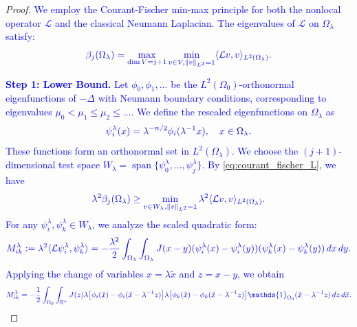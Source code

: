 \documentclass[12pt, a4paper]{article}
\newcommand{\revision}[1]{\textcolor{blue}{#1}}
\theoremstyle{break}
\theoremstyle{break}
\theoremstyle{break}
\theoremstyle{break}
\theoremstyle{break}
\theoremstyle{break}
\theoremstyle{break}
\theoremstyle{break}
\theoremstyle{break}
\begin{document}
\begin{proof}
    \revision{We employ the Courant-Fischer min-max principle for both the nonlocal operator $\mathcal{L}$ and the classical Neumann Laplacian. The eigenvalues of $\mathcal{L}$ on $\Omega_\lambda$ satisfy:}
    \begin{equation}
        \label{eq:courant_fischer_L}
        \revision{\beta_j(\Omega_\lambda) = \max_{\dim V = j+1} \min_{v \in V, \|v\|_{L^2} = 1} \langle \mathcal{L}v, v \rangle_{L^2(\Omega_\lambda)}.}
    \end{equation}
    
    \revision{\textbf{Step 1: Lower Bound.} Let $\phi_0, \phi_1, \dots$ be the $L^2(\Omega_0)$-orthonormal eigenfunctions of $-\Delta$ with Neumann boundary conditions, corresponding to eigenvalues $\mu_0 < \mu_1 \leq \mu_2 \leq \dots$. We define the rescaled eigenfunctions on $\Omega_\lambda$ as}
    \begin{equation}
        \revision{\psi_i^\lambda(x) = \lambda^{-n/2} \phi_i(\lambda^{-1} x), \quad x \in \Omega_\lambda.}
    \end{equation}
    \revision{These functions form an orthonormal set in $L^2(\Omega_\lambda)$. We choose the $(j+1)$-dimensional test space $W_\lambda = \operatorname{span}\{\psi_0^\lambda, \dots, \psi_j^\lambda\}$. By \eqref{eq:courant_fischer_L}, we have}
    \begin{equation}
        \revision{\lambda^2 \beta_j(\Omega_\lambda) \geq \min_{v \in W_\lambda, \|v\|_{L^2}=1} \lambda^2 \langle \mathcal{L}v, v \rangle_{L^2(\Omega_\lambda)}.}
    \end{equation}
    \revision{For any $\psi_i^\lambda, \psi_k^\lambda \in W_\lambda$, we analyze the scaled quadratic form:}
    \begin{equation}
        \revision{M_{ik}^\lambda := \lambda^2 \langle \mathcal{L}\psi_i^\lambda, \psi_k^\lambda \rangle = -\frac{\lambda^2}{2} \int_{\Omega_\lambda} \int_{\Omega_\lambda} J(x-y) (\psi_i^\lambda(x) - \psi_i^\lambda(y))(\psi_k^\lambda(x) - \psi_k^\lambda(y)) \, dx \, dy.}
    \end{equation}
    \revision{Applying the change of variables $x = \lambda \tilde{x}$ and $z = x-y$, we obtain}
    \begin{equation}
        \revision{M_{ik}^\lambda = -\frac{1}{2} \int_{\Omega_0} \int_{\mathbb{R}^n} J(z) \lambda \big[ \phi_i(\tilde{x}) - \phi_i(\tilde{x} - \lambda^{-1} z) \big] \lambda \big[ \phi_k(\tilde{x}) - \phi_k(\tilde{x} - \lambda^{-1} z) \big] \mathds{1}_{\Omega_0}(\tilde{x} - \lambda^{-1} z) \, dz \, d\tilde{x}.}

\end{equation}
\end{proof}
\end{document}
